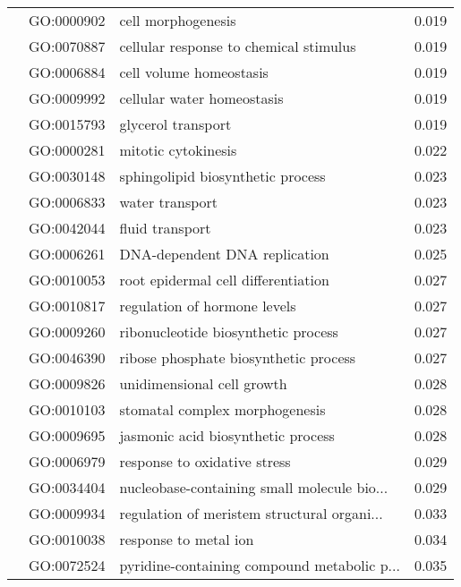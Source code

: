 \begin{longtable}{lllr}
   & GO:0000902 &                           cell morphogenesis &         0.019 \\
   & GO:0070887 &       cellular response to chemical stimulus &         0.019 \\
   & GO:0006884 &                      cell volume homeostasis &         0.019 \\
   & GO:0009992 &                   cellular water homeostasis &         0.019 \\
   & GO:0015793 &                           glycerol transport &         0.019 \\
   & GO:0000281 &                          mitotic cytokinesis &         0.022 \\
   & GO:0030148 &            sphingolipid biosynthetic process &         0.023 \\
   & GO:0006833 &                              water transport &         0.023 \\
   & GO:0042044 &                              fluid transport &         0.023 \\
   & GO:0006261 &                DNA-dependent DNA replication &         0.025 \\
   & GO:0010053 &          root epidermal cell differentiation &         0.027 \\
   & GO:0010817 &                 regulation of hormone levels &         0.027 \\
   & GO:0009260 &          ribonucleotide biosynthetic process &         0.027 \\
   & GO:0046390 &        ribose phosphate biosynthetic process &         0.027 \\
   & GO:0009826 &                   unidimensional cell growth &         0.028 \\
   & GO:0010103 &               stomatal complex morphogenesis &         0.028 \\
   & GO:0009695 &           jasmonic acid biosynthetic process &         0.028 \\
   & GO:0006979 &                 response to oxidative stress &         0.029 \\
   & GO:0034404 &  nucleobase-containing small molecule bio... &         0.029 \\
   & GO:0009934 &  regulation of meristem structural organi... &         0.033 \\
   & GO:0010038 &                        response to metal ion &         0.034 \\
   & GO:0072524 &  pyridine-containing compound metabolic p... &         0.035 \\

\end{longtable}
